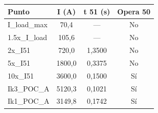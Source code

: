 \begin{tabular}{lccc}
\toprule
\textbf{Punto} & \textbf{I (A)} & \textbf{t 51 (s)} & \textbf{Opera 50} \\
\midrule
I\_load\_max & 70,4 & --- & No \\
1.5x\_I\_load & 105,6 & --- & No \\
2x\_I51 & 720,0 & 1,3500 & No \\
5x\_I51 & 1800,0 & 0,3375 & No \\
10x\_I51 & 3600,0 & 0,1500 & Sí \\
Ik3\_POC\_A & 5120,3 & 0,1021 & Sí \\
Ik1\_POC\_A & 3149,8 & 0,1742 & Sí \\
\bottomrule
\end{tabular}
